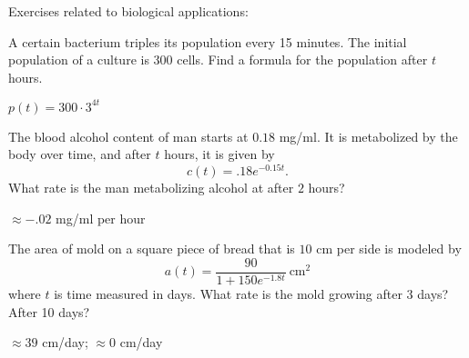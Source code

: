\begin{exercises}
\noindent Exercises related to biological applications:

\begin{exercise}
A certain bacterium triples its population every 15 minutes. The
initial population of a culture is 300 cells. Find a formula for the
population after $t$ hours. 
\begin{answer}
$p(t) = 300\cdot3^{4t}$
\end{answer}
\end{exercise}

\begin{exercise}
The blood alcohol content of man starts at $0.18$ mg/ml. It is metabolized by the body over time, and after $t$ hours, it is given by
\[
c(t) = .18e^{-0.15 t}.
\]
What rate is the man metabolizing alcohol at after $2$ hours?
\begin{answer}
$\approx -.02$ mg/ml per hour
\end{answer}
\end{exercise}

\begin{exercise}
The area of mold on a square piece of bread that is $10$ cm per side
is modeled by
\[
a(t) = \frac{90}{1+150e^{-1.8 t}}~\text{cm}^2
\]
where $t$ is time measured in days. What rate is the mold growing after 3 days? After 10 days?
\begin{answer}
$\approx 39$ cm/day; $\approx 0$ cm/day
\end{answer}
\end{exercise}






\end{exercises}







